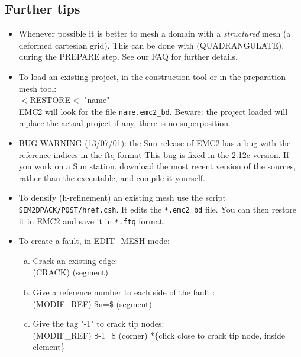 \subsection{Further tips}
\begin{itemize}
\item Whenever possible it is better to mesh a domain with a \emph{structured}
   mesh (a deformed cartesian grid). This can be done with \textsf{(QUADRANGULATE)},
   during the PREPARE step. 
   See our FAQ for further details.

\item To load an existing project, in the construction tool
   or in the preparation mesh tool:\\
	\textsf{$<$RESTORE$<$ "name"}\\ 
   EMC2 will look for the file \texttt{name.emc2\_bd}.
   Beware: the project loaded will replace the actual 
   project if any, there is no superposition.

\item BUG WARNING (13/07/01): the Sun release of EMC2 has a bug
   with the reference indices in the ftq format
   This bug is fixed in the 2.12c version.
   If you work on a Sun station, download the most recent version of the sources,
   rather than the executable, and compile it yourself.

\item To densify (h-refinement) an existing mesh use the script 
   \texttt{SEM2DPACK/POST/href.csh}.
   It edits the \texttt{*.emc2\_bd} file. 
   You can then restore it in EMC2 and save it in \texttt{*.ftq} format.

\item To create a fault, in \textsf{EDIT\_MESH} mode:
  \begin{enumerate}[a.]
    \item Crack an existing edge:\\
	\textsf{(CRACK) (segment)}
    \item Give a reference number to each side of the fault :\\
	\textsf{(MODIF\_REF) \$n=\$ (segment)}
    \item Give the tag "-1" to crack tip nodes:\\
        \textsf{(MODIF\_REF) \$-1=\$ (corner) *\{click close to crack tip node, inside element\}} \\
  \end{enumerate}


\end{itemize}
